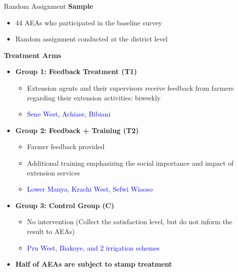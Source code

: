 \documentclass[aspectratio=169]{beamer}
\begin{document}
\begin{frame}{Random Assignment}
	\scriptsize
	\textbf{Sample}
	\begin{itemize}
		\item 44 AEAs who participated in the baseline survey
		\item Random assignment conducted at the district level
	\end{itemize}
	
	
	\textbf{Treatment Arms}
	\begin{itemize}
		\item \textbf{Group 1: Feedback Treatment (T1)}
		\begin{itemize}
			\item Extension agents and their supervisors receive feedback from farmers regarding their extension activities: biweekly
			\item \textcolor{blue}{Sene West, Achiase, Bibiani}
		\end{itemize}
		
		\item \textbf{Group 2: Feedback + Training (T2)}
		\begin{itemize}
			\item Farmer feedback provided
			\item Additional training emphasizing the social importance and impact of extension services
			\item \textcolor{blue}{Lower Manya, Krachi West, Sefwi Wiaoso}
		\end{itemize}
		
		\item \textbf{Group 3: Control Group (C)}
		\begin{itemize}
			\item No intervention (Collect the satisfaction level, but do not inform the result to AEAs) 
			\item \textcolor{blue}{Pru West, Biakoye, and 2 irrigation schemes}
		\end{itemize}
		
		\item \textbf{Half of AEAs are subject to stamp treatment}
		
	\end{itemize}
	
\end{frame}
\end{document}
